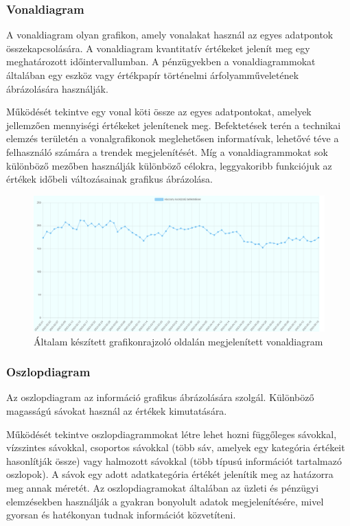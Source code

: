 \subsubsection{Vonaldiagram}

A vonaldiagram olyan grafikon, amely vonalakat használ az egyes adatpontok összekapcsolására. A vonaldiagram kvantitatív értékeket jelenít meg egy meghatározott időintervallumban. A pénzügyekben a vonaldiagrammokat általában egy eszköz vagy értékpapír történelmi árfolyamműveletének ábrázolására használják. 

	Működését tekintve egy vonal köti össze az egyes adatpontokat, amelyek jellemzően mennyiségi értékeket jelenítenek meg. Befektetések terén a technikai elemzés területén a vonalgrafikonok meglehetősen informatívak, lehetővé téve a felhasználó számára a trendek megjelenítését. Míg a vonaldiagrammokat sok különböző mezőben használják különböző célokra, leggyakoribb funkciójuk az értékek időbeli változásainak grafikus ábrázolása.

\begin{figure}[h]
\centering
\includegraphics[scale=0.3]{images/lineChartExample}
\caption{Általam készített grafikonrajzoló oldalán megjelenített vonaldiagram}
\end{figure}

\subsubsection{Oszlopdiagram}

Az oszlopdiagram az információ grafikus ábrázolására szolgál. Különböző magasságú sávokat használ az értékek kimutatására. 

	Működését tekintve oszlopdiagrammokat létre lehet hozni függőleges sávokkal, vízszintes sávokkal, csoportos sávokkal (több sáv, amelyek egy kategória értékeit hasonlítják össze) vagy halmozott sávokkal (több típusú információt tartalmazó oszlopok). A sávok egy adott adatkategória értékét jelenítik meg az hatázorra meg annak méretét. Az oszlopdiagramokat általában az üzleti és pénzügyi elemzésekben használják a gyakran bonyolult adatok megjelenítésére, mivel gyorsan és hatékonyan tudnak információt közvetíteni.

